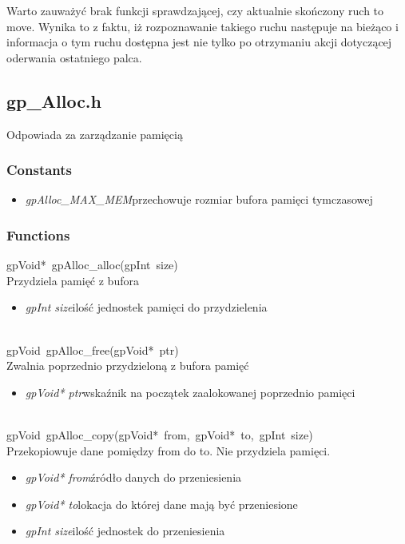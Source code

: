 Warto zauważyć brak funkcji sprawdzającej, czy aktualnie skończony ruch to move. Wynika to z faktu, iż rozpoznawanie takiego ruchu następuje na bieżąco i informacja o tym ruchu dostępna jest nie tylko po otrzymaniu akcji dotyczącej oderwania ostatniego palca.

\subsection{gp_Alloc.h}
Odpowiada za zarządzanie pamięcią
\subsubsection{Constants}
\begin{itemize}
\item \textit{gpAlloc_MAX_MEM}\qquad przechowuje rozmiar bufora pamięci tymczasowej
\end{itemize}
\subsubsection{Functions}
\mbox{\textsf{gpVoid* gpAlloc_alloc(gpInt size)}} \\ \indent Przydziela pamięć z bufora
	\begin{itemize}
		\item \textit{gpInt size}\quad ilość jednostek pamięci do przydzielenia
	\end{itemize}

 \ \\
\mbox{\textsf{gpVoid gpAlloc_free(gpVoid* ptr)}} \\ \indent Zwalnia poprzednio przydzieloną z bufora pamięć
	\begin{itemize}
		\item \textit{gpVoid* ptr}\quad wskaźnik na początek zaalokowanej poprzednio pamięci
	\end{itemize}

 \ \\
\mbox{\textsf{gpVoid gpAlloc_copy(gpVoid* from, gpVoid* to, gpInt size)}} \\ \indent Przekopiowuje dane pomiędzy from do to. Nie przydziela pamięci.
	\begin{itemize}
		\item \textit{gpVoid* from}\quad źródło danych do przeniesienia
		\item \textit{gpVoid* to}\quad lokacja do której dane mają być przeniesione
		\item \textit{gpInt size}\quad ilość jednostek do przeniesienia
	\end{itemize}


